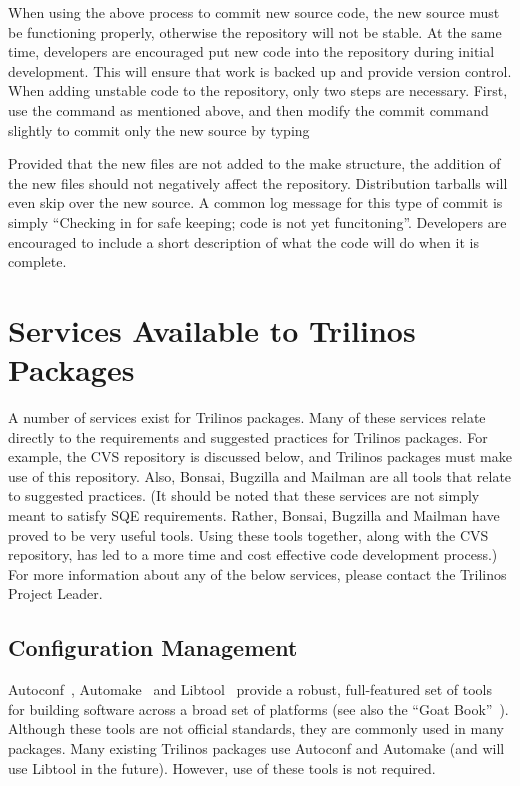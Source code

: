 \documentclass[12pt,relax]{TrilinosDevGuide}
\begin{document}
\begin{enumerate}
When using the above process to commit new source code, the new source must 
be functioning properly, otherwise the repository will not be stable.  
At the same time, developers are encouraged put new code into the repository 
during initial development.  This will ensure that work is backed up and 
provide version control.  When adding unstable code to the repository, only
two steps are necessary.  First, use the  command as 
mentioned above, and then modify the commit command slightly to commit only 
the new source by typing


Provided that the new files are not added to the make structure, the addition 
of the new files should not negatively affect the repository.  Distribution 
tarballs will even skip over the new source.  A common log message for this 
type of commit is simply ``Checking in for safe keeping; code is not yet 
funcitoning''.  Developers are encouraged to include a short description of 
what the code will do when it is complete.
\end{enumerate}

\section{Services Available to Trilinos Packages}
\label{Section:AvailableServices}
A number of services exist for Trilinos packages.  Many of these services 
relate directly to the requirements and suggested practices for Trilinos 
packages.  For example, the CVS repository is discussed below, and 
Trilinos packages must make use of this repository.  Also, Bonsai, Bugzilla 
and Mailman are all tools that relate to suggested practices.  (It should be 
noted that these services are not simply meant to satisfy SQE requirements.  
Rather, Bonsai, Bugzilla and Mailman have proved to be very useful tools.  
Using these tools together, along with the CVS repository, has led to a more 
time and cost effective code development process.)  For more information about 
any of the below services, please contact the Trilinos Project Leader.

\subsection{Configuration Management}
Autoconf~\cite{Autoconf},  Automake~\cite{Automake} and Libtool~\cite{Libtool} 
provide a robust, full-featured set of tools for building software across a 
broad set of platforms (see also the ``Goat Book''~\cite{GoatBook}).  Although 
these tools are not official standards, they are commonly used in many 
packages.  Many existing Trilinos packages use Autoconf and Automake (and will 
use Libtool in the future).  However, use of these tools is not required.
\end{document}
